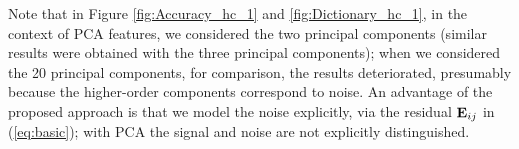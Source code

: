 \documentclass[journal]{IEEEtran}
\begin{document}

Note that in Figure \ref{fig:Accuracy_hc_1} and  \ref{fig:Dictionary_hc_1}, in the context of PCA features, we considered the two principal components (similar results were obtained with the three principal components); when we considered the 20 principal components, for comparison, the results deteriorated, presumably because the higher-order components correspond to noise. An advantage of the proposed approach is that we model the noise explicitly, via the residual ${\mathbf E}_{ij}$ in (\ref{eq:basic}); with PCA the signal and noise are not explicitly distinguished. 
\end{document}
